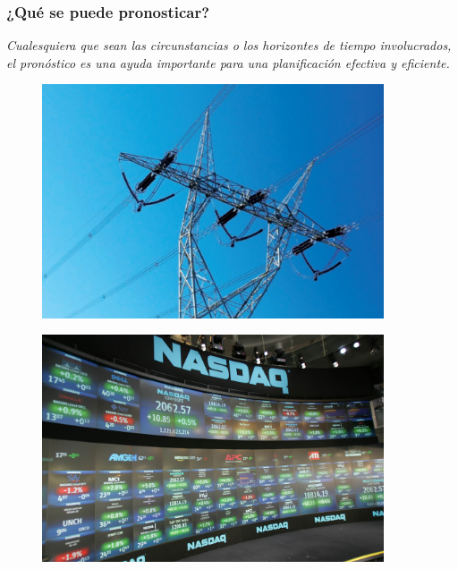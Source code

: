 \documentclass[10pt]{beamer}
\begin{document}




\begin{frame}
\frametitle{¿Qué se puede pronosticar?}

\begin{center}
\textit{Cualesquiera que sean las circunstancias o los horizontes de tiempo involucrados, el pronóstico es una ayuda importante para una planificación efectiva y eficiente.}
\end{center}

\vspace{4mm}

\begin{minipage}{0.3\textwidth}
\pause
\begin{figure}
\begin{center}
    \includegraphics[width=0.9\textwidth]{Imagen1.JPG}
\end{center}
\end{figure}
\end{minipage}
\begin{minipage}{0.3\textwidth}
\pause
\begin{figure}
\begin{center}
    \includegraphics[width=0.9\textwidth]{Imagen2.JPG}

\end{center}
\end{figure}
\end{minipage}
\end{frame}
\end{document}
